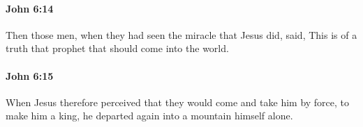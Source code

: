 		\paragraph{John 6:14} %
			\label{JOHN-6-14}

			Then those men, when they had seen the miracle that Jesus did, said, This is of a truth that prophet that should come into the world.

			\begin{framed}
			\scriptsize
				\begin{compactdesc}
					\item[SBLG] 
				\end{compactdesc}
			\end{framed}

		\paragraph{John 6:15} %
			\label{JOHN-6-15}

			When Jesus therefore perceived that they would come and take him by force, to make him a king, he departed again into a mountain himself alone.


